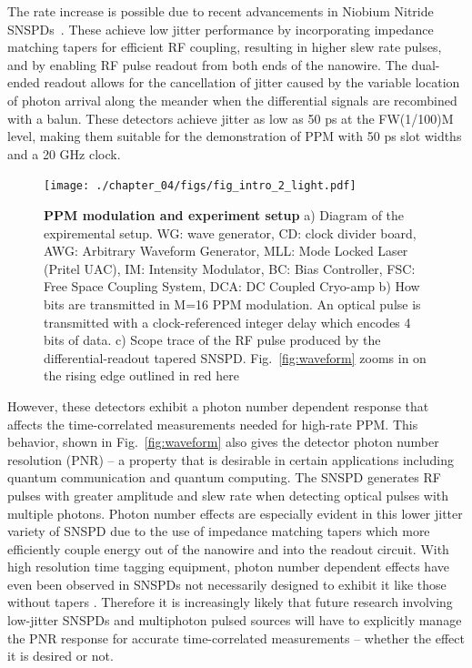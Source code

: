 \documentclass[11pt]{caltech_thesis} %
\begin{document}
The rate increase is possible due to recent advancements in Niobium Nitride SNSPDs~\autocite{Colangelo2023}. These achieve low jitter performance by incorporating impedance matching tapers for efficient RF coupling, resulting in higher slew rate pulses, and by enabling RF pulse readout from both ends of the nanowire. The dual-ended readout allows for the cancellation of jitter caused by the variable location of photon arrival along the meander when the differential signals are recombined with a balun. These detectors achieve jitter as low as 50 ps at the FW(1/100)M level, making them suitable for the demonstration of PPM with 50 ps slot widths and a 20 GHz clock.

\hypertarget{fig:intro}{%
\begin{figure}
\centering
\texttt{[image: ./chapter\_04/figs/fig\_intro\_2\_light.pdf]}
\caption[{PPM modulation and experiment setup}]{\textbf{PPM modulation and experiment setup} a) Diagram of the expiremental setup. WG: wave generator, CD: clock divider board, AWG: Arbitrary Waveform Generator, MLL: Mode Locked Laser (Pritel UAC), IM: Intensity Modulator, BC: Bias Controller, FSC: Free Space Coupling System, DCA: DC Coupled Cryo-amp b) How bits are transmitted in M=16 PPM modulation. An optical pulse is transmitted with a clock-referenced integer delay which encodes 4 bits of data. c) Scope trace of the RF pulse produced by the differential-readout tapered SNSPD. Fig.~\ref{fig:waveform} zooms in on the rising edge outlined in red here}
\label{fig:intro}
\end{figure}
}

However, these detectors exhibit a photon number dependent response that affects the time-correlated measurements needed for high-rate PPM. This behavior, shown in Fig.~\ref{fig:waveform} also gives the detector photon number resolution (PNR) -- a property that is desirable in certain applications including quantum communication and quantum computing. The SNSPD generates RF pulses with greater amplitude and slew rate when detecting optical pulses with multiple photons. Photon number effects are especially evident in this lower jitter variety of SNSPD due to the use of impedance matching tapers which more efficiently couple energy out of the nanowire and into the readout circuit. With high resolution time tagging equipment, photon number dependent effects have even been observed in SNSPDs not necessarily designed to exhibit it \autocite{schapeler2023superconducting,sauer2023resolving} like those without tapers \autocite{Cahall2017SlewRatePNR}. Therefore it is increasingly likely that future research involving low-jitter SNSPDs and multiphoton pulsed sources will have to explicitly manage the PNR response for accurate time-correlated measurements -- whether the effect it is desired or not.
\end{document}
